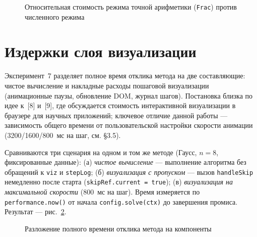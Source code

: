 \documentclass[12pt, oneside]{book}
\begin{document}
\begin{figure}[htbp]
\centering
{}
\caption{Относительная стоимость режима точной арифметики (\texttt{Frac}) против численного режима}
\label{fig:exp_exact}
\end{figure}

\section{Издержки слоя визуализации}
\label{sec:exp_viz}

    \quad Эксперимент~7 разделяет полное время отклика метода на две составляющие: чистое вычисление и накладные расходы пошаговой визуализации (анимационные паузы, обновление DOM, журнал шагов). Постановка близка по идее к~[8] и~[9], где обсуждается стоимость интерактивной визуализации в браузере для научных приложений; ключевое отличие данной работы --- зависимость общего времени от пользовательской настройки скорости анимации (3200/1600/800~мс на шаг, см. §3.5).

    \quad Сравниваются три сценария на одном и том же методе (Гаусс, $n = 8$, фиксированные данные): (а) \emph{чистое вычисление} --- выполнение алгоритма без обращений к \texttt{viz} и \texttt{stepLog}; (б) \emph{визуализация с пропуском} --- вызов \texttt{handleSkip} немедленно после старта (\texttt{skipRef.current = true}); (в) \emph{визуализация на максимальной скорости} (800~мс на шаг). Время измеряется по \texttt{performance.now()} от начала \texttt{config.solve(ctx)} до завершения промиса. Результат --- рис.~\ref{fig:exp_viz}.

\begin{figure}[htbp]
\centering
{}
\caption{Разложение полного времени отклика метода на компоненты}
\label{fig:exp_viz}
\end{figure}
\end{document}
